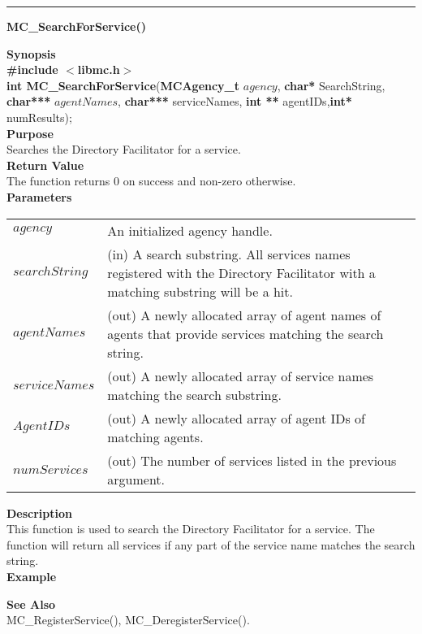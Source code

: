 \noindent
\vspace{5pt}
\rule{6.5in}{0.015in}
\noindent
{}
{\LARGE \bf MC\_SearchForService()}\\
\label{api:MC_SearchForService()}

\noindent
{\bf Synopsis}\\
{\bf \#include $<$libmc.h$>$}\\
{\bf int MC\_SearchForService}({\bf MCAgency\_t} $agency$, {\bf char*} SearchString,  {\bf char***} $agentNames$, {\bf char***} serviceNames, {\bf int **} agentIDs,{\bf int*} numResults);\\

\noindent
{\bf Purpose}\\
Searches the Directory Facilitator for a service.\\

\noindent
{\bf Return Value}\\
The function returns 0 on success and non-zero otherwise.\\

\noindent
{\bf Parameters}
\vspace{-0.1in}
\begin{description}
\item
\begin{tabular}{p{23 mm}p{145 mm}} 
$agency$ & An initialized agency handle.\\
$searchString$ & (in) A search substring. All services names registered with the Directory Facilitator with a matching substring will be a hit. \\
$agentNames$ & (out) A newly allocated array of agent names of agents that provide services matching the search string. \\
$serviceNames$ & (out) A newly allocated array of service names matching the search substring. \\
$AgentIDs$ & (out) A newly allocated array of agent IDs of matching agents. \\
$numServices$ & (out) The number of services listed in the previous argument.
\end{tabular}
\end{description}

\noindent
{\bf Description}\\
This function is used to search the Directory Facilitator for a service.
The function will return all services if any part of the service name 
matches the search string. \\

\noindent
{\bf Example}\\
\noindent
{\footnotesize}

\noindent
{\bf See Also}\\
MC\_RegisterService(), MC\_DeregisterService().

